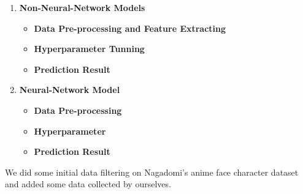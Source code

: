 \documentclass[11.5pt]{article}
\begin{document}
\begin{enumerate}
        \item \textbf{Non-Neural-Network Models}
        \begin{itemize}
            \item \textbf{Data Pre-processing and Feature Extracting}
            \item \textbf{Hyperparameter Tunning}
            \item \textbf{Prediction Result}
        \end{itemize}
        \item \textbf{Neural-Network Model}
        \begin{itemize}
            \item \textbf{Data Pre-processing}
            \item \textbf{Hyperparameter}
            \item \textbf{Prediction Result}
        \end{itemize}
    \end{enumerate}

    We did some initial data filtering on Nagadomi's anime face character dataset and added some data collected by ourselves.
\end{document}
